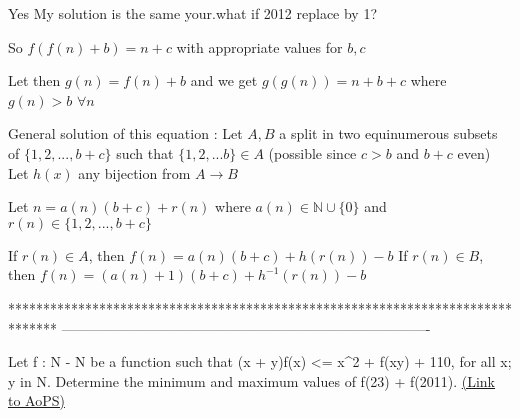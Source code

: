 \begin{solution}
	\begin{tcolorbox}Yes My solution is the same your.what if 2012 replace by 1?\end{tcolorbox}
So $f(f(n)+b)=n+c$ with appropriate values for $b,c$

Let then $g(n)=f(n)+b$ and we get $g(g(n))=n+b+c$ where $g(n)>b$ $\forall n$

General solution of this equation :
Let $A,B$ a split in two equinumerous subsets of $\{1,2,...,b+c\}$ such that $\{1,2,... b\}\in A$ (possible since $c>b$ and $b+c$ even)
Let $h(x)$ any bijection from $A\to B$

Let $n=a(n)(b+c)+r(n)$ where $a(n)\in\mathbb N\cup\{0\}$ and $r(n)\in\{1,2,...,b+c\}$

If $r(n)\in A$, then $f(n)=a(n)(b+c)+h(r(n))-b$
If $r(n)\in B$, then $f(n)=(a(n)+1)(b+c)+h^{-1}(r(n))-b$
\end{solution}
*******************************************************************************
-------------------------------------------------------------------------------

\begin{problem}
	Let f : N - N be a function such that (x + y)f(x) <= x^2 + f(xy) + 110, for all x; y in N.
Determine the minimum and maximum values of f(23) + f(2011).
	\flushright \href{https://artofproblemsolving.com/community/c6h469528}{(Link to AoPS)}
\end{problem}



